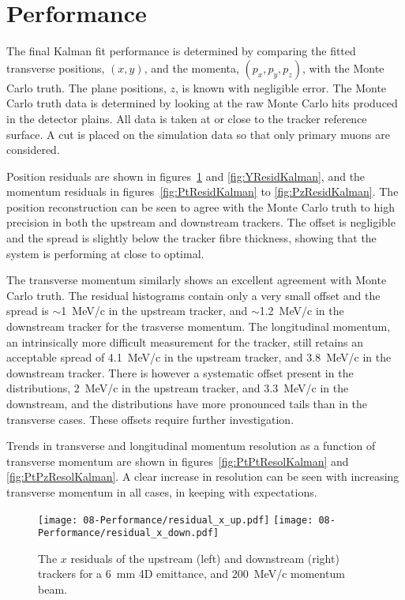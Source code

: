 \section{Performance}
\label{sec:Performance}

  The final Kalman fit performance is determined by comparing the fitted transverse positions, $(x,y)$, and the momenta, $(p_x, p_y, p_z)$, with the Monte Carlo truth. The plane positions, $z$, is known with negligible error. The Monte Carlo truth data is determined by looking at the raw Monte Carlo hits produced in the detector plains.  All data is taken at or close to the tracker reference surface. A cut is placed on the simulation data so that only primary muons are considered. 
  
  Position residuals are shown in figures~\ref{fig:XResidKalman} and \ref{fig:YResidKalman}, and the momentum residuals in figures~\ref{fig:PtResidKalman} to \ref{fig:PzResidKalman}.  The position reconstruction can be seen to agree with the Monte Carlo truth to high precision in both the upstream and downstream trackers. The offset is negligible and the spread is slightly below the tracker fibre thickness, showing that the system is performing at close to optimal.
  
  The transverse momentum similarly shows an excellent agreement with Monte Carlo truth. The residual histograms contain only a very small offset and the spread is $\sim$1~MeV/c in the upstream tracker, and $\sim$1.2~MeV/c in the downstream tracker for the trasverse momentum.  The longitudinal momentum, an intrinsically more difficult measurement for the tracker, still retains an acceptable spread of 4.1~MeV/c in the upstream tracker, and 3.8~MeV/c in the downstream tracker.  There is however a systematic offset present in the distributions, 2~MeV/c in the upstream tracker, and 3.3~MeV/c in the downstream, and the distributions have more pronounced tails than in the transverse cases.  These offsets require further investigation.
  
  Trends in transverse and longitudinal momentum resolution as a function of transverse momentum are shown in figures~\ref{fig:PtPtResolKalman} and \ref{fig:PtPzResolKalman}. A clear increase in resolution can be seen with increasing transverse momentum in all cases, in keeping with expectations.

  \begin{figure}[p]
    \begin{center}
      \texttt{[image: 08-Performance/residual\_x\_up.pdf]}
      \texttt{[image: 08-Performance/residual\_x\_down.pdf]}
      \caption{\label{fig:XResidKalman} The $x$ residuals of the upstream (left) and downstream (right) trackers for a 6~mm 4D emittance, and 200~MeV/c momentum beam.}
    \end{center}
  \end{figure}
  
